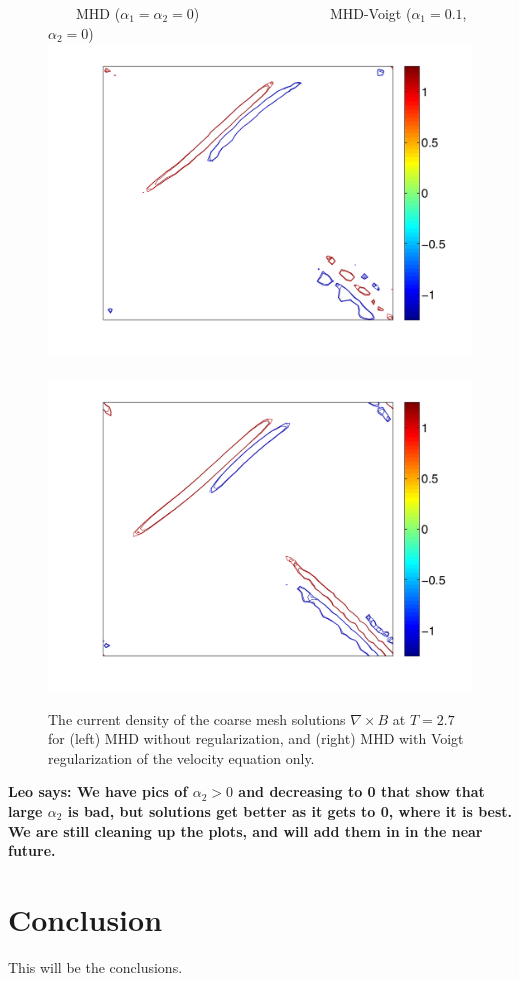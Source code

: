 \documentclass[11pt]{article}%
\numberwithin{equation}{section}
\begin{document}
\begin{figure}[htb]
\begin{center}
\ \ \ \ MHD ($\alpha_1=\alpha_2=0$) \ \ \ \ \ \ \ \ \ \ \ \ \ \ \ \ \ \ MHD-Voigt ($\alpha_1=0.1$, $\alpha_2=0$)
\includegraphics[width=.4\textwidth,height=0.4\textwidth, viewport=70 20 530 400, clip]{MHD_TO_DNS_coarse.pdf}\ \ \ 
\includegraphics[width=.4\textwidth,height=0.4\textwidth, viewport=70 20 530 400, clip]{MHD_TO_Voigt_coarse.pdf}
\caption{\label{orszagcoarse} The current density of the coarse mesh solutions $\nabla \times B$ at $T=2.7$ for (left) MHD without regularization, and (right) MHD with Voigt regularization of the velocity equation only.}
\end{center}
\end{figure}

{\bf Leo says: We have pics of $\alpha_2>0$ and decreasing to 0 that show that large $\alpha_2$ is bad, but solutions get better as it gets to 0, where it is best.  We are still cleaning up the plots, and will add them in in the near future.}


\section{Conclusion}
This will be the conclusions.


\end{document}
